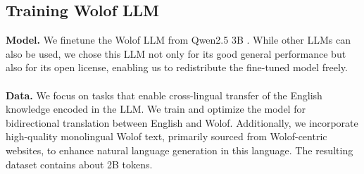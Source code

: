 \documentclass{article}
\newcommand{\myparagraph}[1]{\noindent\textbf{#1}}
\begin{document}
\subsection{Training Wolof LLM}
\myparagraph{Model.} We finetune the Wolof LLM from Qwen2.5 3B \cite{qwen2, qwen2.5}. While other LLMs can also be used, we chose this LLM not only for its good general performance but also for its open license, enabling us to redistribute the fine-tuned model freely. 
\\
\\
\myparagraph{Data.} We focus on tasks that enable cross-lingual transfer of the English knowledge encoded in the LLM. We train and optimize the model for bidirectional translation between English and Wolof. Additionally, we incorporate high-quality monolingual Wolof text, primarily sourced from Wolof-centric websites, to enhance natural language generation in this language. The resulting dataset contains about 2B tokens.
\end{document}

